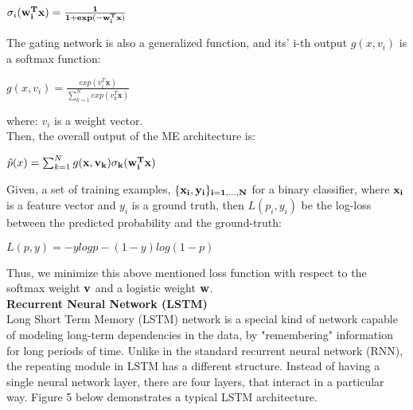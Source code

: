 \documentclass{sig-alternate-05-2015}
\begin{document}
\begin{center}
$\sigma_{i}(\bf{w_{i}^{T}x}) = \frac{1}{1 + exp(-w_{i}^{T}\textbf{x})}$
\end{center} 

\noindent 
The gating network is also a generalized function, and its' i-th output $g(x, v_{i})$ is a softmax function: 
\begin{center}
$g(x, v_{i}) = \frac{exp(v_{i}^{T}\textbf{x})}{\sum_{k=1}^{N}exp(v_{k}^{T}\textbf{x})}$
\end{center}

\noindent 
where: $v_{i}$ is a weight vector. \\

\noindent 
Then, the overall output of the ME architecture is: 

\begin{center}
$\hat{p} (x)= \sum_{k=1}^{N}g(\bf{x}, v_{k})\sigma_{k}(\bf{w}_{i}^{T}\bf{x})$
\end{center}

\noindent 
Given, a set of training examples, $\{\bf{x}_{i}, y_{i} \}_{i = 1, ...,N}$ for a binary classifier, where $\bf{x}_{i}$  is a feature vector and $y_{i}$ is a ground truth, then $\textit{L}(p_{i}, y_{i})$ be the log-loss between the predicted probability and the ground-truth: 

\begin{center}
$\textit{L}(p, y) = -ylogp - (1-y)log(1-p)$
\end{center}

\noindent 
Thus, we minimize this above mentioned loss function with respect to the softmax weight $\bf{v}$ and a logistic weight $\bf{w}$. \\

\vspace{3em}
\noindent 
\textbf{Recurrent Neural Network (LSTM)} \\
Long Short Term Memory (LSTM) network is a special kind of network capable of modeling long-term dependencies in the data, by "remembering" information for long periods of time. Unlike in the standard recurrent neural network (RNN), the repeating module in LSTM has a different structure. Instead of having a single neural network layer, there are four layers, that interact in a particular way. Figure 5 below demonstrates a typical LSTM architecture. \\ \\ \\ \\ \\
\end{document}
